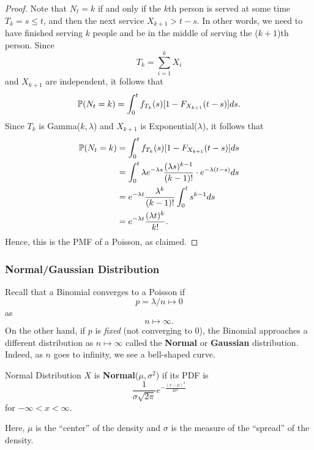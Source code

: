 \begin{mdframed}[]
    \begin{proof}
        Note that $N_t = k$ if and only if the $k$th person is served at some time $T_k = s \leq t$, and then the next service $X_{k + 1} > t - s$. In other words, we need to have finished serving $k$ people and be in the middle of serving the ($k + 1$)th person. Since \[T_k = \sum_{i = 1}^{k} X_i\] and $X_{k + 1}$ are independent, it follows that 
        \[\mathbb{P}(N_t = k) = \int_{0}^t f_{T_k}(s) [1 - F_{X_{k + 1}} (t - s)] ds.\]
        Since $T_k$ is Gamma($k, \lambda$) and $X_{k + 1}$ is Exponential($\lambda$), it follows that 
        \begin{equation*}
            \begin{aligned}
                \PR(N_t = k) &= \int_{0}^t f_{T_k}(s) [1 - F_{X_{k + 1}} (t - s)] ds \\ 
                    &= \int_{0}^{t} \lambda e^{-\lambda s} \frac{(\lambda s)^{k - 1}}{(k - 1)!} \cdot e^{-\lambda (t - s)} ds \\ 
                    &= e^{-\lambda t} \frac{\lambda^k}{(k - 1)!} \int_{0}^{t} s^{k - 1} ds \\ %
                    &= e^{-\lambda t} \frac{(\lambda t)^k}{k!}.
            \end{aligned}
        \end{equation*}
        Hence, this is the PMF of a Poisson, as claimed. 
    \end{proof}
\end{mdframed}

\subsubsection{Normal/Gaussian Distribution}
Recall that a Binomial converges to a Poisson if 
\[p = \lambda / n \mapsto 0\]
as \[n \mapsto \infty.\]
On the other hand, if $p$ is \emph{fixed} (not converging to 0), the Binomial approaches a different distribution as $n \mapsto \infty$ called the \textbf{Normal} or \textbf{Gaussian} distribution. Indeed, as $n$ goes to infinity, we see a bell-shaped curve. 
\begin{definition}{Normal Distribution}{}
    $X$ is \textbf{Normal}($\mu, \sigma^2$) if its PDF is 
    \[\frac{1}{\sigma \sqrt{2\pi}} e^{-\frac{(x - \mu)^2}{2 \sigma^2}}\]
    for $-\infty < x < \infty$. 
\end{definition}
Here, $\mu$ is the ``center'' of the density and $\sigma$ is the measure of the ``spread'' of the density. 

